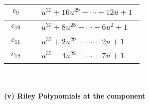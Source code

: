 \documentclass[1p]{elsarticle_modified}
\theoremstyle{definition}
\begin{document}
\begin{tabular}{m{50pt}|m{274pt}}
\hline $$\begin{aligned}c_{9}\end{aligned}$$&$\begin{aligned}
&u^{30}+16 u^{29}+\cdots+12 u+1
\end{aligned}$\\
\hline $$\begin{aligned}c_{10}\end{aligned}$$&$\begin{aligned}
&u^{30}+8 u^{28}+\cdots+6 u^2+1
\end{aligned}$\\
\hline $$\begin{aligned}c_{11}\end{aligned}$$&$\begin{aligned}
&u^{30}+2 u^{29}+\cdots+2 u+1
\end{aligned}$\\
\hline $$\begin{aligned}c_{12}\end{aligned}$$&$\begin{aligned}
&u^{30}-4 u^{28}+\cdots+7 u+1
\end{aligned}$\\
\hline
\end{tabular}\\~\\
\newpage\renewcommand{\arraystretch}{1}
\flushleft \textbf{(v) Riley Polynomials at the component}\newline \\
\end{document}

